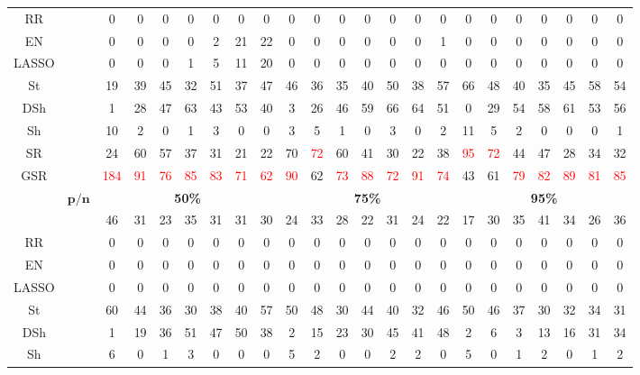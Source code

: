 \begin{table}
{\begin{tabular*}{\textwidth}{@{\extracolsep{\fill}}cc|ccccccc|ccccccc|ccccccc@{}}
RR &  & 0 & 0 & 0 & 0 & 0 & 0 & 0 & 0 & 0 & 0 & 0 & 0 & 0 & 0 & 0 & 0 & 0 & 0 & 0 & 0 & 0 \\
EN &  & 0 & 0 & 0 & 0 & 2 & 21 & 22 & 0 & 0 & 0 & 0 & 0 & 0 & 1 & 0 & 0 & 0 & 0 & 0 & 0 & 0 \\
LASSO &  & 0 & 0 & 0 & 1 & 5 & 11 & 20 & 0 & 0 & 0 & 0 & 0 & 0 & 0 & 0 & 0 & 0 & 0 & 0 & 0 & 0 \\
St &  & 19 & 39 & 45 & 32 & 51 & 37 & 47 & 46 & 36 & 35 & 40 & 50 & 38 & 57 & 66 & 48 & 40 & 35 & 45 & 58 & 54 \\
DSh &  & 1 & 28 & 47 & 63 & 43 & 53 & 40 & 3 & 26 & 46 & 59 & 66 & 64 & 51 & 0 & 29 & 54 & 58 & 61 & 53 & 56 \\
Sh &  & 10 & 2 & 0 & 1 & 3 & 0 & 0 & 3 & 5 & 1 & 0 & 3 & 0 & 2 & 11 & 5 & 2 & 0 & 0 & 0 & 1 \\
SR &  & 24 & 60 & 57 & 37 & 31 & 21 & 22 & 70 & \textcolor{red}{72} & 60 & 41 & 30 & 22 & 38 & \textcolor{red}{95} & \textcolor{red}{72} & 44 & 47 & 28 & 34 & 32 \\
GSR &  & \textcolor{red}{184} & \textcolor{red}{91} & \textcolor{red}{76} & \textcolor{red}{85} & \textcolor{red}{83} & \textcolor{red}{71} & \textcolor{red}{62} & \textcolor{red}{90} & 62 & \textcolor{red}{73} & \textcolor{red}{88} & \textcolor{red}{72} & \textcolor{red}{91} & \textcolor{red}{74} & 43 & 61 & \textcolor{red}{79} & \textcolor{red}{82} & \textcolor{red}{89} & \textcolor{red}{81} & \textcolor{red}{85} \\
\hline
\multirow{2}{*}{} & $\bm{p/n}$ & \multicolumn{7}{c|}{\textbf{50\%}} & \multicolumn{7}{c|}{\textbf{75\%}} & \multicolumn{7}{c}{\textbf{95\%}} \\
\hline
OLS &  & 46 & 31 & 23 & 35 & 31 & 31 & 30 & 24 & 33 & 28 & 22 & 31 & 24 & 22 & 17 & 30 & 35 & 41 & 34 & 26 & 36 \\
RR &  & 0 & 0 & 0 & 0 & 0 & 0 & 0 & 0 & 0 & 0 & 0 & 0 & 0 & 0 & 0 & 0 & 0 & 0 & 0 & 0 & 0 \\
EN &  & 0 & 0 & 0 & 0 & 0 & 0 & 0 & 0 & 0 & 0 & 0 & 0 & 0 & 0 & 0 & 0 & 0 & 0 & 0 & 0 & 0 \\
LASSO &  & 0 & 0 & 0 & 0 & 0 & 0 & 0 & 0 & 0 & 0 & 0 & 0 & 0 & 0 & 0 & 0 & 0 & 0 & 0 & 0 & 0 \\
St &  & 60 & 44 & 36 & 30 & 38 & 40 & 57 & 50 & 48 & 30 & 44 & 40 & 32 & 46 & 50 & 46 & 37 & 30 & 32 & 34 & 31 \\
DSh &  & 1 & 19 & 36 & 51 & 47 & 50 & 38 & 2 & 15 & 23 & 30 & 45 & 41 & 48 & 2 & 6 & 3 & 13 & 16 & 31 & 34 \\
Sh &  & 6 & 0 & 1 & 3 & 0 & 0 & 0 & 5 & 2 & 0 & 0 & 2 & 2 & 0 & 5 & 0 & 1 & 2 & 0 & 1 & 2 \\

\end{tabular*}}
\end{table}
